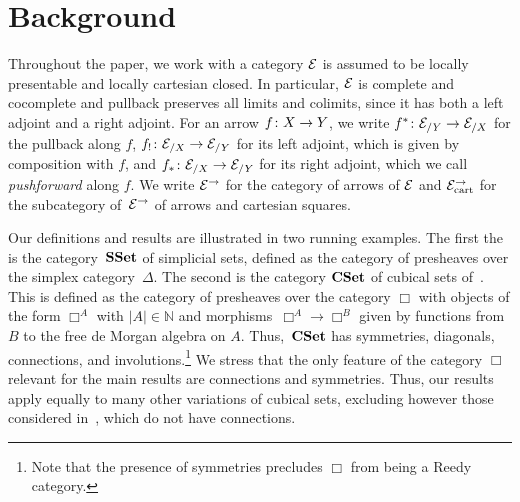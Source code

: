 \documentclass[reqno,10pt,a4paper,oneside,draft]{amsart}
\begin{document}

\section{Background} 
\label{sec:fib-and-frob}


Throughout the paper, we work with a category $\cal{E}$ is assumed to be locally presentable and locally cartesian closed. In particular,
$\catE$ is complete and cocomplete and pullback preserves all limits and colimits, since it has both a left 
adjoint and  a right adjoint. For an arrow $f \co X \to Y$, we write $f^* \co \cal{E}_{/Y} \to \cal{E}_{/X}$ for the pullback along $f$, 
$f_{!} \co \cal{E}_{/X} \to \cal{E}_{/Y}$ for its left adjoint, which is given by composition with $f$, and $f_* \co \cal{E}_{/X} \to \cal{E}_{/Y}$
for its right adjoint, which we call \emph{pushforward} along $f$. We write $\cal{E}^\to$ for the category of arrows of $\cal{E}$
and $\cal{E}^\to_{\mathrm{cart}}$ for the subcategory of~$\cal{E}^\to$ of arrows and cartesian squares. 

Our definitions and results are illustrated  in two running examples. The first the is the category~$\SSet$ of simplicial sets, defined as the category of 
presheaves over the simplex category~$\Delta$. The second is the category $\CSet$ of cubical sets of~\cite{cohen-et-al:cubicaltt}. This is defined as the category of presheaves over 
the category $\Box$ with objects of the form $\Box^A$ with $|A| \in \mathbb{N}$ and morphisms~$\Box^A \to \Box^B$ given by functions from $B$ to the free de Morgan algebra on $A$. 
Thus,~$\CSet$ has symmetries, diagonals, connections, and involutions.\footnote{Note that the presence of symmetries precludes $\Box$ from being a Reedy category.} We stress that the only feature of the category $\Box$ relevant for the main results  are connections and symmetries.
Thus, our results apply equally to many other variations of cubical sets, excluding however those considered in~\cite{coquand-cubical-sets,huber-thesis}, which do not have connections.
\end{document}
